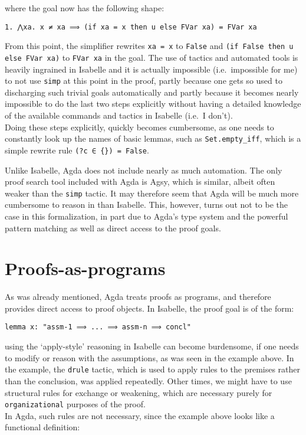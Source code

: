 \documentclass[a4paper, 12pt, twoside]{style/ociamthesis}
\theoremstyle{plain}
\theoremstyle{definition}
\theoremstyle{remark}
\begin{document}
where the goal now has the following shape:

\begin{verbatim}
1. ⋀xa. x ≠ xa ⟹ (if xa = x then u else FVar xa) = FVar xa
\end{verbatim}

From this point, the simplifier rewrites \texttt{xa = x} to
\texttt{False} and \texttt{(if False then u else FVar xa)} to
\texttt{FVar xa} in the goal. The use of tactics and automated tools is
heavily ingrained in Isabelle and it is actually impossible
(i.e.~impossible for me) to not use \texttt{simp} at this point in the
proof, partly because one gets so used to discharging such trivial goals
automatically and partly because it becomes nearly impossible to do the
last two steps explicitly without having a detailed knowledge of the
available commands and tactics in Isabelle (i.e.~I don't).\\
Doing these steps explicitly, quickly becomes cumbersome, as one needs
to constantly look up the names of basic lemmas, such as
\texttt{Set.empty\_iff}, which is a simple rewrite rule
\texttt{(?c ∈ \{\}) = False}.

Unlike Isabelle, Agda does not include nearly as much automation. The
only proof search tool included with Agda is Agsy, which is similar,
albeit often weaker than the \texttt{simp} tactic. It may therefore seem
that Agda will be much more cumbersome to reason in than Isabelle. This,
however, turns out not to be the case in this formalization, in part due
to Agda's type system and the powerful pattern matching as well as
direct access to the proof goals.

\section{Proofs-as-programs}\label{proofs-as-programs}

As was already mentioned, Agda treats proofs as programs, and therefore
provides direct access to proof objects. In Isabelle, the proof goal is
of the form:

\begin{verbatim}
lemma x: "assm-1 ⟹ ... ⟹ assm-n ⟹ concl"
\end{verbatim}

using the `apply-style' reasoning in Isabelle can become burdensome, if
one needs to modify or reason with the assumptions, as was seen in the
example above. In the example, the \texttt{drule} tactic, which is used
to apply rules to the premises rather than the conclusion, was applied
repeatedly. Other times, we might have to use structural rules for
exchange or weakening, which are necessary purely for
\texttt{organizational} purposes of the proof.\\
In Agda, such rules are not necessary, since the example above looks
like a functional definition:
\end{document}
